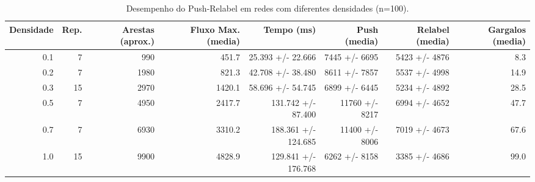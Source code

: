 \begin{table}
\caption{Desempenho do Push-Relabel em redes com diferentes densidades (n=100).}
\label{tab:densidade}
\begin{tabular}{r r r r r r r r}
\toprule
Densidade & Rep. & Arestas (aprox.) & Fluxo Max. (media) & Tempo (ms) & Push (media) & Relabel (media) & Gargalos (media) \\
\midrule
0.1 & 7 & 990 & 451.7 & 25.393 +/- 22.666 & 7445 +/- 6695 & 5423 +/- 4876 & 8.3 \\
0.2 & 7 & 1980 & 821.3 & 42.708 +/- 38.480 & 8611 +/- 7857 & 5537 +/- 4998 & 14.9 \\
0.3 & 15 & 2970 & 1420.1 & 58.696 +/- 54.745 & 6899 +/- 6445 & 5234 +/- 4892 & 28.5 \\
0.5 & 7 & 4950 & 2417.7 & 131.742 +/- 87.400 & 11760 +/- 8217 & 6994 +/- 4652 & 47.7 \\
0.7 & 7 & 6930 & 3310.2 & 188.361 +/- 124.685 & 11400 +/- 8006 & 7019 +/- 4673 & 67.6 \\
1.0 & 15 & 9900 & 4828.9 & 129.841 +/- 176.768 & 6262 +/- 8158 & 3385 +/- 4686 & 99.0 \\
\bottomrule
\end{tabular}
\end{table}
